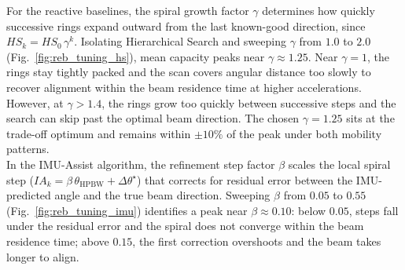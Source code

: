 \documentclass{article}
\begin{document}
\noindent For the reactive baselines, the spiral growth factor $\gamma$ determines how quickly successive rings expand outward from the last known-good direction, since $HS_k = HS_0\,\gamma^k$. Isolating Hierarchical Search and sweeping $\gamma$ from $1.0$ to $2.0$ (Fig.~\ref{fig:reb_tuning_hs}), mean capacity peaks near $\gamma \approx 1.25$. Near $\gamma = 1$, the rings stay tightly packed and the scan covers angular distance too slowly to recover alignment within the beam residence time at higher accelerations. However, at $\gamma > 1.4$, the rings grow too quickly between successive steps and the search can skip past the optimal beam direction. The chosen $\gamma = 1.25$ sits at the trade-off optimum and remains within $\pm 10\%$ of the peak under both mobility patterns.\\

\noindent In the IMU-Assist algorithm, the refinement step factor $\beta$ scales the local spiral step ($IA_k = \beta\,\theta_{\text{HPBW}} + \Delta\theta^{\star}$) that corrects for residual error between the IMU-predicted angle and the true beam direction. Sweeping $\beta$ from $0.05$ to $0.55$ (Fig.~\ref{fig:reb_tuning_imu}) identifies a peak near $\beta \approx 0.10$: below $0.05$, steps fall under the residual error and the spiral does not converge within the beam residence time; above $0.15$, the first correction overshoots and the beam takes longer to align.\\
\end{document}
